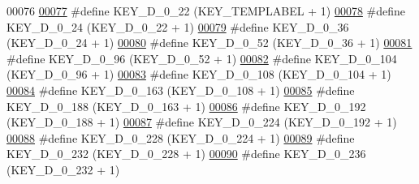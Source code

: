 \begin{DoxyCode}
00076 
\hypertarget{dmp_key_8h_source.tex_l00077}{}\hyperlink{dmp_key_8h_af0873c8b363dd566dc21032860193300}{00077} \textcolor{preprocessor}{#define KEY\_D\_0\_22                  (KEY\_TEMPLABEL + 1)}
\hypertarget{dmp_key_8h_source.tex_l00078}{}\hyperlink{dmp_key_8h_a831c958c87b23c6216e8385cda7de3b6}{00078} \textcolor{preprocessor}{#define KEY\_D\_0\_24                  (KEY\_D\_0\_22 + 1)}
\hypertarget{dmp_key_8h_source.tex_l00079}{}\hyperlink{dmp_key_8h_a6bfccb29906ebc85dfa35e9c88e15b9d}{00079} \textcolor{preprocessor}{#define KEY\_D\_0\_36                  (KEY\_D\_0\_24 + 1)}
\hypertarget{dmp_key_8h_source.tex_l00080}{}\hyperlink{dmp_key_8h_a326762aac6aaf7e3aac39556229bb999}{00080} \textcolor{preprocessor}{#define KEY\_D\_0\_52                  (KEY\_D\_0\_36 + 1)}
\hypertarget{dmp_key_8h_source.tex_l00081}{}\hyperlink{dmp_key_8h_a80b93be0fea044def553e18670d5032d}{00081} \textcolor{preprocessor}{#define KEY\_D\_0\_96                  (KEY\_D\_0\_52 + 1)}
\hypertarget{dmp_key_8h_source.tex_l00082}{}\hyperlink{dmp_key_8h_a35d749f51ec4fcbf2abd7cc2c4ea5a2d}{00082} \textcolor{preprocessor}{#define KEY\_D\_0\_104                 (KEY\_D\_0\_96 + 1)}
\hypertarget{dmp_key_8h_source.tex_l00083}{}\hyperlink{dmp_key_8h_a67f29e65b6421d7d8c750389508c904d}{00083} \textcolor{preprocessor}{#define KEY\_D\_0\_108                 (KEY\_D\_0\_104 + 1)}
\hypertarget{dmp_key_8h_source.tex_l00084}{}\hyperlink{dmp_key_8h_aa062d41f202bcb4dc036c2f65115a169}{00084} \textcolor{preprocessor}{#define KEY\_D\_0\_163                 (KEY\_D\_0\_108 + 1)}
\hypertarget{dmp_key_8h_source.tex_l00085}{}\hyperlink{dmp_key_8h_a0cdb5b848e5771c1e18e11513628806d}{00085} \textcolor{preprocessor}{#define KEY\_D\_0\_188                 (KEY\_D\_0\_163 + 1)}
\hypertarget{dmp_key_8h_source.tex_l00086}{}\hyperlink{dmp_key_8h_ace2bc6282ca8c6e3a226d81bc0a4f2f1}{00086} \textcolor{preprocessor}{#define KEY\_D\_0\_192                 (KEY\_D\_0\_188 + 1)}
\hypertarget{dmp_key_8h_source.tex_l00087}{}\hyperlink{dmp_key_8h_ac793f65090ac62fdc8821cf59fb1ec5a}{00087} \textcolor{preprocessor}{#define KEY\_D\_0\_224                 (KEY\_D\_0\_192 + 1)}
\hypertarget{dmp_key_8h_source.tex_l00088}{}\hyperlink{dmp_key_8h_adcdba2672a0bf9d1c519c5101351160c}{00088} \textcolor{preprocessor}{#define KEY\_D\_0\_228                 (KEY\_D\_0\_224 + 1)}
\hypertarget{dmp_key_8h_source.tex_l00089}{}\hyperlink{dmp_key_8h_a7c10b1c90336275cd7055e9e7eb71f53}{00089} \textcolor{preprocessor}{#define KEY\_D\_0\_232                 (KEY\_D\_0\_228 + 1)}
\hypertarget{dmp_key_8h_source.tex_l00090}{}\hyperlink{dmp_key_8h_a7f3b517a452bb2eb6170a65153042224}{00090} \textcolor{preprocessor}{#define KEY\_D\_0\_236                 (KEY\_D\_0\_232 + 1)}

\end{DoxyCode}
